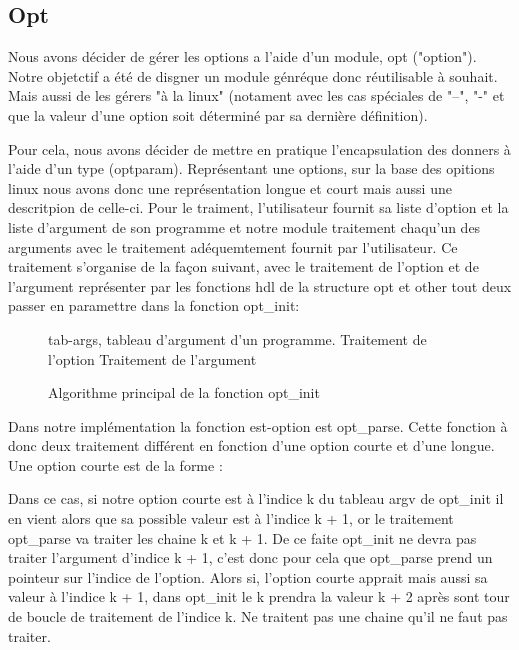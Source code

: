 \documentclass[12pt]{article}
\renewcommand{\algorithmicwhile}{\textbf{Tant que}}
\begin{document}
        
        \subsection{Opt}

        Nous avons décider de gérer les options a l'aide d'un module, opt ("option"). Notre objetctif a été de disgner un module génréque donc réutilisable à souhait. Mais aussi de les gérers "à la linux" (notament avec les cas spéciales de "--", "-" et que la valeur d'une option soit déterminé par sa dernière définition). 

        Pour cela, nous avons décider de mettre en pratique l'encapsulation des donners à l'aide d'un type (optparam). Représentant une options, sur la base des opitions linux nous avons donc une représentation longue et court mais aussi une descritpion de celle-ci. Pour le traiment, l'utilisateur fournit sa liste d'option et la liste d'argument de son programme et notre module traitement chaqu'un des arguments avec le traitement adéquemtement fournit par l'utilisateur. Ce traitement s'organise de la façon suivant, avec le traitement de l'option et de l'argument représenter par les fonctions hdl de la structure opt et other tout deux passer en paramettre dans la fonction opt\_init:\\

        \begin{figure}[ht]
            \renewcommand{\algorithmicwhile}{\textbf{Pour chaque}}
            \begin{algorithmic}
                \REQUIRE tab-args, tableau d'argument d'un programme.
                        \STATE Traitement de l'option
                    \ELSE
                         \STATE Traitement de l'argument
                    \ENDIF
                \ENDWHILE
            \end{algorithmic}
            \caption{Algorithme principal de la fonction opt\_init}
        \end{figure}

        Dans notre implémentation la fonction est-option est opt\_parse. Cette fonction à donc deux traitement différent en fonction d'une option courte et d'une longue. Une option courte est de la forme : 


        Dans ce cas, si notre option courte est à l'indice k du tableau argv de opt\_init il en vient alors que sa possible valeur est à l'indice k + 1, or le traitement opt\_parse va traiter les chaine k et k + 1. De ce faite opt\_init ne devra pas traiter l'argument d'indice k + 1, c'est donc pour cela que opt\_parse prend un pointeur sur l'indice de l'option. Alors si, l'option courte apprait mais aussi sa valeur à l'indice k + 1, dans opt\_init le k prendra la valeur k + 2 après sont tour de boucle de traitement de l'indice k. Ne traitent pas une chaine qu'il ne faut pas traiter.
\end{document}
